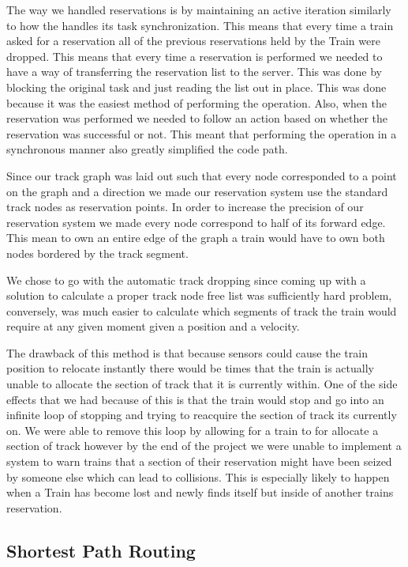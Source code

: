 \documentclass[pdftex,10pt,a4paper]{article}
\begin{document}
The way we handled reservations is by maintaining an active iteration similarly
to how the  handles its task synchronization. This means that
every time a train asked for a reservation all of the previous reservations held
by the Train were dropped. This means that every time a reservation is performed
we needed to have a way of transferring the reservation list to the server. This
was done by blocking the original task and just reading the list out in place.
This was done because it was the easiest method of performing the operation.
Also, when the reservation was performed we needed to follow an action based on
whether the reservation was successful or not. This meant that performing the
operation in a synchronous manner also greatly simplified the code path.

Since our track graph was laid out such that every node corresponded to a point
on the graph and a direction we made our reservation system use the standard
track nodes as reservation points. In order to increase the precision of our
reservation system we made every node correspond to half of its forward edge.
This mean to own an entire edge of the graph a train would have to own both
nodes bordered by the track segment.

We chose to go with the automatic track dropping since coming up with a solution
to calculate a proper track node free list was sufficiently hard problem,
conversely, was much easier to calculate which segments of track the train would
require at any given moment given a position and a velocity.

The drawback of this method is that because sensors could cause the train
position to relocate instantly there would be times that the train is actually
unable to allocate the section of track that it is currently within. One of the
side effects that we had because of this is that the train would stop and go
into an infinite loop of stopping and trying to reacquire the section of track
its currently on. We were able to remove this loop by allowing for a train to
for allocate a section of track however by the end of the project we were unable
to implement a system to warn trains that a section of their reservation might
have been seized by someone else which can lead to collisions. This is
especially likely to happen when a Train has become lost and newly finds itself
but inside of another trains reservation.

\subsection*{Shortest Path Routing}
\end{document}
